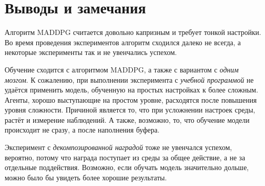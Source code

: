 \section{Выводы и замечания}

Алгоритм MADDPG считается довольно капризным и требует тонкой настройки. Во время проведения экспериментов алгоритм сходился далеко не всегда, а некоторые эксперименты так и не увенчались успехом.

Обучение сходится с алгоритмом MADDPG, а также с вариантом с \textit{одним мозгом}. К сожалению, при выполнении эксперимента с \textit{учебной программой} не удаётся применить модель, обученную на простых настройках к более сложным. Агенты, хорошо выступающие на простом уровне, расходятся после повышения уровня сложности. Причиной является то, что при усложнении настроек среды, растёт и измерение наблюдений. А также, возможно, то, что обучение модели происходит не сразу, а после наполнения буфера.

Эксперимент с \textit{декомпозированной наградой} тоже не увенчался успехом, вероятно, потому что награда поступает из среды за общее действие, а не за отдельные поддействия. Возможно, если обучать модель значительно дольше, можно было бы увидеть более хорошие результаты.


\newpage
